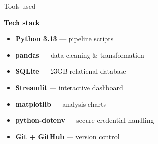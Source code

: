 \documentclass{beamer}
\begin{document}
	\begin{frame}{Tools used}
	
			\textcolor{accentBlue}{\textbf{Tech stack}}
			\begin{itemize}
					\item \textbf{Python 3.13} — pipeline scripts
					\item \textbf{pandas} — data cleaning \& transformation
					\item \textbf{SQLite} — 23GB relational database
					\item \textbf{Streamlit} — interactive dashboard
					\item \textbf{matplotlib} — analysis charts
					\item \textbf{python-dotenv} — secure credential handling
					\item \textbf{Git + GitHub} — version control
				\end{itemize}
	\end{frame}
	
\end{document}
